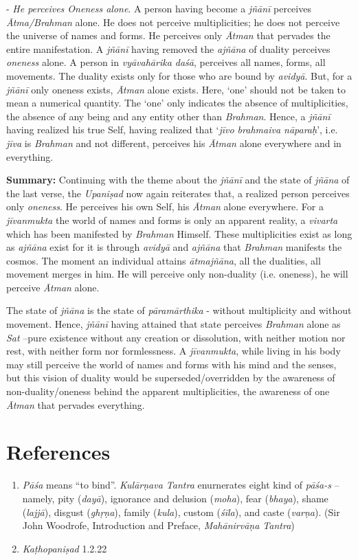 - \emph{He perceives Oneness alone}. A person having become a \emph{jñānī} perceives \emph{Ātma/Brahman} alone. He does not perceive multiplicities; he does not perceive the universe of names and forms. He perceives only \emph{Ātman} that pervades the entire manifestation. A \emph{jñānī} having removed the \emph{ajñāna} of duality perceives \emph{oneness} alone. A person in \emph{vyāvahārika daśā}, perceives all names, forms, all movements. The duality exists only for those who are bound by \emph{avidyā}. But, for a \emph{jñānī} only oneness exists, \emph{Ātman} alone exists. Here, `one' should not be taken to mean a numerical quantity. The `one' only indicates the absence of multiplicities, the absence of any being and any entity other than \emph{Brahman}. Hence, a \emph{jñānī} having realized his true Self, having realized that `\emph{jīvo brahmaiva nāparaḥ}', i.e. \emph{jīva} is \emph{Brahman} and not different, perceives his \emph{Ātman} alone everywhere and in everything.

\textbf{Summary:} Continuing with the theme about the \emph{jñānī} and the state of \emph{jñāna} of the last verse, the \emph{Upaniṣad} now again reiterates that, a realized person perceives only \emph{oneness}. He perceives his own Self, his \emph{Ātman} alone everywhere. For a \emph{jīvanmukta} the world of names and forms is only an apparent reality, a \emph{vivarta} which has been manifested by \emph{Brahman} Himself. These multiplicities exist as long as \emph{ajñāna} exist for it is through \emph{avidyā} and \emph{ajñāna} that \emph{Brahman} manifests the cosmos. The moment an individual attains \emph{ātmajñāna}, all the dualities, all movement merges in him. He will perceive only non-duality (i.e. oneness), he will perceive \emph{Ātman} alone.

The state of \emph{jñāna} is the state of \emph{pāramārthika} - without multiplicity and without movement. Hence, \emph{jñānī} having attained that state perceives \emph{Brahman} alone as \emph{Sat} --pure existence without any creation or dissolution, with neither motion nor rest, with neither form nor formlessness. A \emph{jīvanmukta}, while living in his body may still perceive the world of names and forms with his mind and the senses, but this vision of duality would be superseded/overridden by the awareness of non-duality/oneness behind the apparent multiplicities, the awareness of one \emph{Ātman} that pervades everything.

\section*{References}

\begin{enumerate}
\itemsep=0pt
\item
  \emph{Pāśa} means ``to bind''. \emph{Kulārṇava Tantra} enurnerates eight kind of \emph{pāśa-s} -- namely, pity (\emph{dayā}), ignorance and delusion (\emph{moha}), fear (\emph{bhaya}), shame (\emph{lajjā}), disgust (\emph{ghṛṇa}), family (\emph{kula}), custom (\emph{śīla}), and caste (\emph{varṇa}). (Sir John Woodrofe, Introduction and Preface, \emph{Mahānirvāṇa Tantra})
\item
  \emph{Kaṭhopaniṣad} 1.2.22
\end{enumerate}
